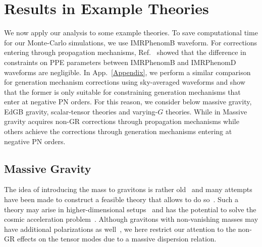 \documentclass[prd,twocolumn,nofootinbib]{revtex4-1}
\begin{document}

\section{Results in Example Theories}

We now apply our analysis to some example theories. To save computational time for our Monte-Carlo simulations, we use IMRPhenomB waveform. For corrections entering through propagation mechanisms, Ref.~\cite{Yunes:2016jcc} showed that the difference in constraints on PPE parameters between IMRPhenomB and IMRPhenomD waveforms are negligible. In App.~\ref{Appendix}, we perform a similar comparison for generation mechanism corrections using sky-averaged waveforms and show that the former is only suitable for constraining generation mechanisms that enter at negative PN orders. For this reason, we consider below massive gravity, EdGB gravity, scalar-tensor theories and varying-$G$ theories. While in Massive gravity acquires non-GR corrections through propagation mechanisms while others achieve the corrections through generation mechanisms entering at negative PN orders.



\subsection{Massive Gravity}
\label{sec:massive}
The idea of introducing the mass to gravitons is rather old~\cite{Fierz:1939ix} and many attempts have been made to construct a feasible theory that allows to do so~\cite{deRham:2014zqa}.  Such a theory may arise in higher-dimensional setups~\cite{Hinterbichler:2011tt} and has the potential to solve the cosmic acceleration problem~\cite{deRham:2014zqa}. Although gravitons with non-vanishing masses may have additional polarizations as well~\cite{dePaula:2004bc}, we here restrict our attention to the non-GR effects on the tensor modes due to a massive dispersion relation.

\end{document}
